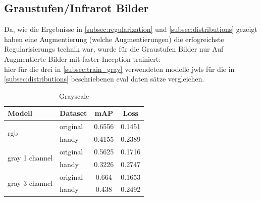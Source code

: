 %         







\subsection{Graustufen/Infrarot Bilder}\label{subsec:eval_gray}

Da, wie die Ergebnisse in \ref{subsec:regularization} und 
\ref{subsec:distributions} gezeigt haben eine Augmentierung (welche 
Augmentierungen) die erfogreichste Regularisierungs technik 
war, wurde für die Graustufen Bilder nur Auf Augmentierte Bilder 
mit faster Inception trainiert:
\\
hier für die drei in \ref{subsec:train_gray} verwendeten modelle 
jwls für die in \ref{subsec:distributions} beschriebenen eval daten 
sätze vergleichen.

\begin{table}[htb]
    \centering
    \label{tab:eval_gray}
    \begin{tabular}{| l | l || c | c |} 
        \hline
        Modell & Dataset & mAP & Loss\\
        \hline
        \multirow{2}{*}{rgb} & original & 0.6556 & 0.1451 \\
        & handy & 0.4155 & 0.2389 \\
        \hline
        \multirow{2}{*}{gray 1 channel} & original & 0.5625 & 0.1716 \\
        & handy & 0.3226 & 0.2747 \\
        \hline
        \multirow{2}{*}{gray 3 channel} & original & 0.664 & 0.1653 \\
        & handy & 0.438 & 0.2492 \\
        \hline
    \end{tabular}        
    \caption{Grayscale}
\end{table}


